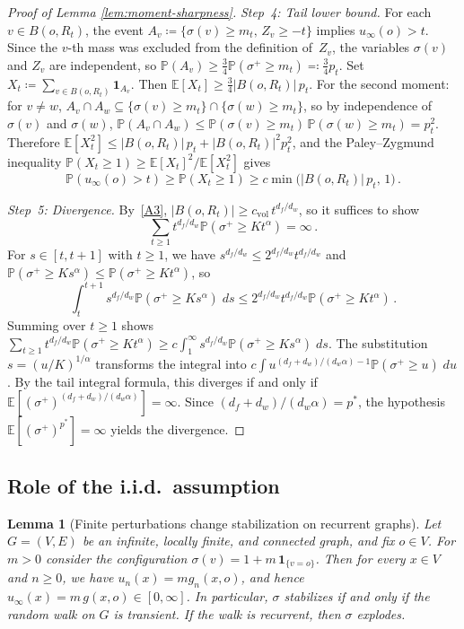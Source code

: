 \documentclass[aop]{imsart}
\theoremstyle{plain}
\newtheorem{lemma}[theorem]{Lemma}
\theoremstyle{definition}
\newcommand{\E}{\mathbb{E}}
\renewcommand{\P}{\mathbb{P}}
\newcommand{\one}{\mathbf{1}}
\begin{document}
\begin{proof}[Proof of Lemma \ref{lem:moment-sharpness}]
		\emph{Step~4: Tail lower bound.}  For each $v\in B(o,R_t)$, the event $A_v\coloneqq\{\sigma(v)\geq m_t,\,Z_v\geq -t\}$ implies $u_\infty(o)>t$. Since the $v$-th mass was excluded from the definition of~$Z_v$, the variables $\sigma(v)$ and $Z_v$ are independent, so $\P(A_v)\geq\frac{3}{4}\P(\sigma^+\geq m_t)\eqqcolon\frac{3}{4}p_t$. Set $X_t\coloneqq\sum_{v\in B(o,R_t)}\one_{A_v}$. Then $\E[X_t]\geq\frac{3}{4}|B(o,R_t)|\,p_t$. For the second moment: for $v\neq w$, $A_v\cap A_w\subseteq\{\sigma(v)\geq m_t\}\cap\{\sigma(w)\geq m_t\}$, so by independence of $\sigma(v)$ and $\sigma(w)$, $\P(A_v\cap A_w)\leq\P(\sigma(v)\geq m_t)\,\P(\sigma(w)\geq m_t)=p_t^2$. Therefore $\E[X_t^2]\leq|B(o,R_t)|\,p_t+|B(o,R_t)|^2 p_t^2$, and the Paley--Zygmund inequality $\P(X_t\geq 1)\geq\E[X_t]^2/\E[X_t^2]$ gives
		\begin{equation}\label{eq:tail-lb}
			\P(u_\infty(o)>t)\geq\P(X_t\geq 1)\geq c\min\bigl(|B(o,R_t)|\,p_t,\,1\bigr)\,.
		\end{equation}
		
		\emph{Step~5: Divergence.}  By~\ref{A3}, $|B(o,R_t)|\geq c_{\mathrm{vol}}\,t^{d_f/d_w}$, so it suffices to show
		\[
		\sum_{t\geq 1}t^{d_f/d_w}\P(\sigma^+\geq Kt^{\alpha})=\infty\,.
		\] For $s\in[t,t+1]$ with $t\geq 1$, we have $s^{d_f/d_w}\leq 2^{d_f/d_w}t^{d_f/d_w}$ and $\P(\sigma^+\geq Ks^{\alpha})\leq\P(\sigma^+\geq Kt^{\alpha})$, so
		\[
		\int_t^{t+1}s^{d_f/d_w}\P(\sigma^+\geq Ks^{\alpha})\; ds\leq 2^{d_f/d_w}t^{d_f/d_w}\P(\sigma^+\geq Kt^{\alpha})\,.
		\]
		Summing over $t\geq 1$ shows $\sum_{t\geq 1}t^{d_f/d_w}\P(\sigma^+\geq Kt^{\alpha})\geq c\int_1^{\infty} s^{d_f/d_w}\P(\sigma^+\geq Ks^{\alpha})\; ds$.  The substitution $s=(u/K)^{1/\alpha}$ transforms the integral into $c\int u^{(d_f+d_w)/(d_w\alpha)-1}\P(\sigma^+\geq u)\; du$.  By the tail integral formula, this diverges if and only if $\E[(\sigma^+)^{(d_f+d_w)/(d_w\alpha)}]=\infty$.  Since $(d_f+d_w)/(d_w\alpha)=p^*$, the hypothesis $\E[(\sigma^+)^{p^*}]=\infty$ yields the divergence.
	\end{proof}
	
	\subsection{Role of the i.i.d.\ assumption}
	
	\begin{lemma}[Finite perturbations change stabilization on recurrent graphs]\label{ex:finite-perturbation}
		Let $G=(V,E)$ be an infinite, locally finite, and connected graph, and fix $o\in V$. For $m>0$ consider the configuration $\sigma(v)=1+m\,\one_{\{v=o\}}$.
		Then for every $x\in V$ and $n\geq 0$, we have $u_n(x)=m g_n(x,o)$, and hence $u_\infty(x)=m\,g(x,o)\in[0,\infty]$. In particular, $\sigma$ stabilizes if and only if the random walk on $G$ is transient. If the walk is recurrent, then $\sigma$ explodes.
	\end{lemma}
	
\end{document}
